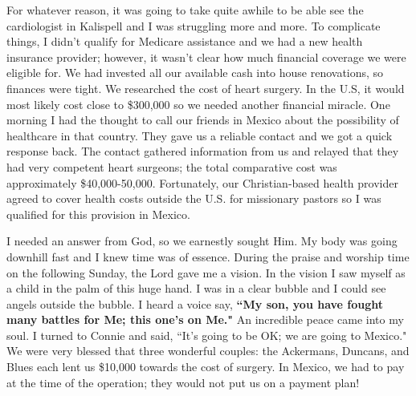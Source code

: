 \documentclass[oneside,12pt]{book}
\begin{document}
For whatever reason, it was going to take quite awhile to be able see the cardiologist in Kalispell and I was struggling more and more. To complicate things, I didn't qualify for Medicare assistance and we had a new health insurance provider; however, it wasn't clear how much financial coverage we were eligible for. We had invested all our available cash into house renovations, so finances were tight. We researched the cost of heart surgery. In the U.S, it would most likely cost close to \$300,000 so we needed another financial miracle. One morning I had the thought to call our friends in Mexico about the possibility of healthcare in that country. They gave us a reliable contact and we got a quick response back. The contact gathered information from us and relayed that they had very competent heart surgeons; the total comparative cost was approximately \$40,000-50,000. Fortunately, our Christian-based health provider agreed to cover health costs outside the U.S. for missionary pastors so I was qualified for this provision in Mexico. 

I needed an answer from God, so we earnestly sought Him. My body was going downhill fast and I knew time was of essence. During the praise and worship time on the following Sunday, the Lord gave me a vision. In the vision I saw myself as a child in the palm of this huge hand. I was in a clear bubble and I could see angels outside the bubble. I heard a voice say, \textbf{``My son, you have fought many battles for Me; this one's on Me."}  An incredible peace came into my soul. I turned to Connie and said, ``It's going to be OK; we are going to Mexico." We were very blessed that three wonderful couples: the Ackermans, Duncans, and Blues each lent us \$10,000 towards the cost of surgery. In Mexico, we had to pay at the time of the operation; they would not put us on a payment plan!
\end{document}
